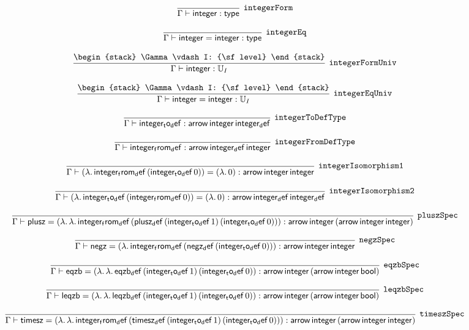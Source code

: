 \[
\infer[{\tt integerForm}]{\Gamma \vdash {\sf integer}: {\sf type}}{}
\]

\[
\infer[{\tt integerEq}]{\Gamma \vdash {\sf integer}= {\sf integer}: {\sf type}}{}
\]

\[
\infer[{\tt integerFormUniv}]{\Gamma \vdash {\sf integer}: {\Bbb U}_{I}}{
\begin{stack}
\Gamma \vdash I: {\sf level}
\end{stack}}
\]

\[
\infer[{\tt integerEqUniv}]{\Gamma \vdash {\sf integer}= {\sf integer}: {\Bbb U}_{I}}{
\begin{stack}
\Gamma \vdash I: {\sf level}
\end{stack}}
\]

\[
\infer[{\tt integerToDefType}]{\Gamma \vdash {\sf integer_to_def}: {\sf arrow}\,{\sf integer}\,{\sf integer_def}}{}
\]

\[
\infer[{\tt integerFromDefType}]{\Gamma \vdash {\sf integer_from_def}: {\sf arrow}\,{\sf integer_def}\,{\sf integer}}{}
\]

\[
\infer[{\tt integerIsomorphism1}]{\Gamma \vdash (\lambda .\,{\sf integer_from_def}\,({\sf integer_to_def}\,0))= (\lambda .\,0): {\sf arrow}\,{\sf integer}\,{\sf integer}}{}
\]

\[
\infer[{\tt integerIsomorphism2}]{\Gamma \vdash (\lambda .\,{\sf integer_to_def}\,({\sf integer_from_def}\,0))= (\lambda .\,0): {\sf arrow}\,{\sf integer_def}\,{\sf integer_def}}{}
\]

\[
\infer[{\tt pluszSpec}]{\Gamma \vdash {\sf plusz}= (\lambda .\,\lambda .\,{\sf integer_from_def}\,({\sf plusz_def}\,({\sf integer_to_def}\,1)\,({\sf integer_to_def}\,0))): {\sf arrow}\,{\sf integer}\,({\sf arrow}\,{\sf integer}\,{\sf integer})}{}
\]

\[
\infer[{\tt negzSpec}]{\Gamma \vdash {\sf negz}= (\lambda .\,{\sf integer_from_def}\,({\sf negz_def}\,({\sf integer_to_def}\,0))): {\sf arrow}\,{\sf integer}\,{\sf integer}}{}
\]

\[
\infer[{\tt eqzbSpec}]{\Gamma \vdash {\sf eqzb}= (\lambda .\,\lambda .\,{\sf eqzb_def}\,({\sf integer_to_def}\,1)\,({\sf integer_to_def}\,0)): {\sf arrow}\,{\sf integer}\,({\sf arrow}\,{\sf integer}\,{\sf bool})}{}
\]

\[
\infer[{\tt leqzbSpec}]{\Gamma \vdash {\sf leqzb}= (\lambda .\,\lambda .\,{\sf leqzb_def}\,({\sf integer_to_def}\,1)\,({\sf integer_to_def}\,0)): {\sf arrow}\,{\sf integer}\,({\sf arrow}\,{\sf integer}\,{\sf bool})}{}
\]

\[
\infer[{\tt timeszSpec}]{\Gamma \vdash {\sf timesz}= (\lambda .\,\lambda .\,{\sf integer_from_def}\,({\sf timesz_def}\,({\sf integer_to_def}\,1)\,({\sf integer_to_def}\,0))): {\sf arrow}\,{\sf integer}\,({\sf arrow}\,{\sf integer}\,{\sf integer})}{}
\]

